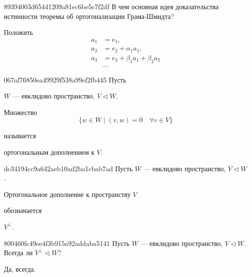 \begin{note}{89394003d65441209a81ec6be5c7f2df}
    В чем основная идея доказательства истинности теоремы об ортогонализации Грама-Шмидта?

    \begin{cloze}{1}
        Положить
        \begin{align*}
            a_1 &= e_1, \\
            a_2 &= e_2 + \alpha_1 a_1, \\
            a_3 &= e_3 + \beta_1 a_1 + \beta_2 a_2 \\
                &\ldots
        \end{align*}
    \end{cloze}
\end{note}

\begin{note}{067af76850ea49929f538a99ef2fb445}
    Пусть \begin{icloze}{3}\({ W }\) --- евклидово пространство, \({ V \triangleleft W }\).\end{icloze}
    \begin{icloze}{1}
        Множество
        \[
            \Big\{ w \in W \mid (v, w) = 0 \quad \forall v \in V \Big\}
        \]
    \end{icloze}
    называется \begin{icloze}{2}ортогональным дополнением к \({ V }\).\end{icloze}
\end{note}

\begin{note}{dc34194cc9a642aeb10ad2ba1cbab7ad}
    Пусть \({ W }\) --- евклидово пространство, \({ V \triangleleft W }\).
    \begin{icloze}{1}Ортогональное дополнение к пространству \({ V }\)\end{icloze} обозначается \begin{icloze}{2}\({ V^{\perp} }\).\end{icloze}
\end{note}

\begin{note}{800460fc49ee4f3b915a92addaba5141}
    Пусть \({ W }\) --- евклидово пространство, \({ V \triangleleft W }\).
    Всегда ли \({ V^{\perp} \triangleleft W }\)?

    \begin{cloze}{1}
        Да, всегда.
    \end{cloze}
\end{note}

